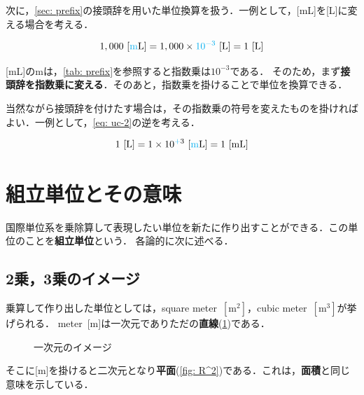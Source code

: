 \documentclass[a4paper,11pt]{ltjsarticle}
\numberwithin{equation}{section}
\begin{document}
次に，\cref{sec: prefix}の接頭辞を用いた単位換算を扱う．一例として，[mL]を[L]に変える場合を考える．

\begin{equation}
  1,000\ [\mathrm{{\color{cyan}m}L}] = 1,000 \times {\color{cyan}10^{-3}}\ [\mathrm{L}] = 1\ [\mathrm{L}] \label{eq: uc-2}
\end{equation}

[mL]の{\color{cyan}m}は，\cref{tab: prefix}を参照すると指数乗は{\color{cyan}$10^{-3}$}である．
そのため，まず\textbf{接頭辞を指数乗に変える}．そのあと，指数乗を掛けることで単位を換算できる．

当然ながら接頭辞を付けたす場合は，その指数乗の符号を変えたものを掛ければよい．一例として，\cref{eq: uc-2}の逆を考える．

\begin{equation}
  1\ [\mathrm{L}] = 1 \times 10^{{\color{cyan}+}3}\ [\mathrm{{\color{cyan}m}L}] = 1\ [\mathrm{mL}] \label{eq: uc-3}
\end{equation}

\section{組立単位とその意味}

国際単位系を乗除算して表現したい単位を新たに作り出すことができる．この単位のことを\textbf{組立単位}という．
各論的に次に述べる．

\subsection{2乗，3乗のイメージ}

乗算して作り出した単位としては，square meter\ $\mathrm{[m^2]}$，cubic meter\ $\mathrm{[m^3]}$が挙げられる．
meter\ [m]は一次元でありただの\textbf{直線}(\cref{fig: R^1})である．

\begin{figure}[htbp]
  \centering
  \caption{一次元のイメージ}
  \label{fig: R^1}
\end{figure}

そこに[m]を掛けると二次元となり\textbf{平面}(\cref{fig: R^2})である．これは，\textbf{面積}と同じ意味を示している．
\end{document}
